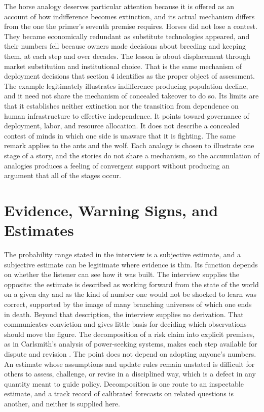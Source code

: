 \documentclass[11pt]{article}
\begin{document}
The horse analogy deserves particular attention because it is offered as an account of how indifference becomes extinction, and its actual mechanism differs from the one the primer's seventh premise requires. Horses did not lose a contest. They became economically redundant as substitute technologies appeared, and their numbers fell because owners made decisions about breeding and keeping them, at each step and over decades. The lesson is about displacement through market substitution and institutional choice. That is the same mechanism of deployment decisions that section 4 identifies as the proper object of assessment. The example legitimately illustrates indifference producing population decline, and it need not share the mechanism of concealed takeover to do so. Its limits are that it establishes neither extinction nor the transition from dependence on human infrastructure to effective independence. It points toward governance of deployment, labor, and resource allocation. It does not describe a concealed contest of minds in which one side is unaware that it is fighting. The same remark applies to the ants and the wolf. Each analogy is chosen to illustrate one stage of a story, and the stories do not share a mechanism, so the accumulation of analogies produces a feeling of convergent support without producing an argument that all of the stages occur.

\section{Evidence, Warning Signs, and Estimates}

The probability range stated in the interview is a subjective estimate, and a subjective estimate can be legitimate where evidence is thin. Its function depends on whether the listener can see how it was built. The interview supplies the opposite: the estimate is described as working forward from the state of the world on a given day and as the kind of number one would not be shocked to learn was correct, supported by the image of many branching universes of which one ends in death. Beyond that description, the interview supplies no derivation. That communicates conviction and gives little basis for deciding which observations should move the figure. The decomposition of a risk claim into explicit premises, as in Carlsmith's analysis of power-seeking systems, makes each step available for dispute and revision \citeyearpar{carlsmith2022}. The point does not depend on adopting anyone's numbers. An estimate whose assumptions and update rules remain unstated is difficult for others to assess, challenge, or revise in a disciplined way, which is a defect in any quantity meant to guide policy. Decomposition is one route to an inspectable estimate, and a track record of calibrated forecasts on related questions is another, and neither is supplied here.
\end{document}

